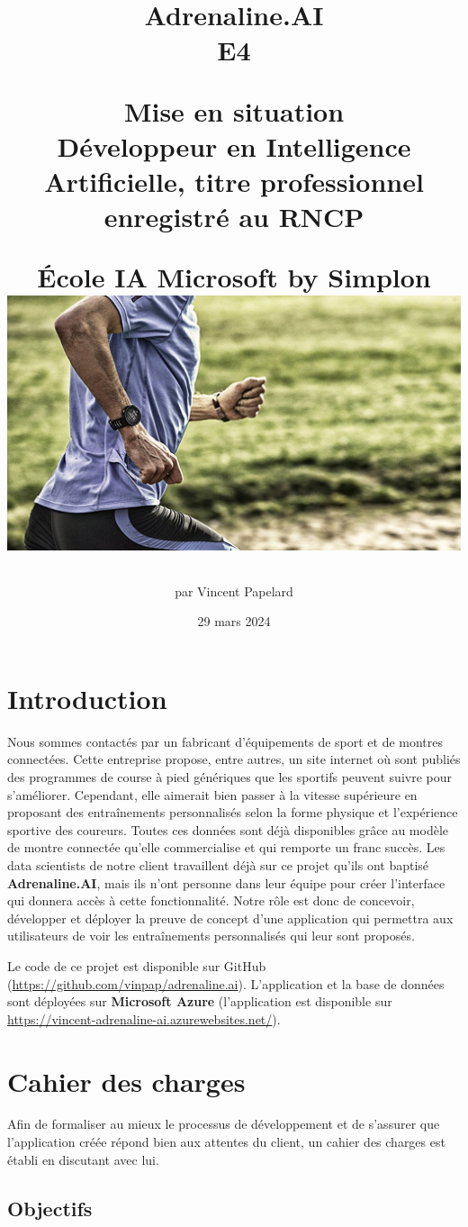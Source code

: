 \documentclass[french]{article}
\title{%
    \huge Adrenaline.AI  \\
    \bigskip
    \large E4 \item Mise en situation \\ 
    Développeur en Intelligence Artificielle,
    titre professionnel enregistré au RNCP \item École IA Microsoft by Simplon
    \vfill
    \includegraphics[width=14cm]{running.jpeg}
    \vfill}
\date{29 mars 2024}
\author{par Vincent Papelard}
\begin{document}
    \renewcommand{\contentsname}{Table des Matières}
    \renewcommand{\refname}{Références}
    \maketitle
    \newpage
    \tableofcontents
    \newpage

    \section*{Introduction}

    Nous sommes contactés par un fabricant d'équipements de sport et de montres connectées. Cette entreprise propose, entre autres, un site internet où sont publiés des programmes de course à pied génériques que les sportifs peuvent suivre pour s'améliorer. Cependant, elle aimerait bien passer à la vitesse supérieure en proposant des entraînements personnalisés selon la forme physique et l'expérience sportive des coureurs. Toutes ces données sont déjà disponibles grâce au modèle de montre connectée qu'elle commercialise et qui remporte un franc succès. Les data scientists de notre client travaillent déjà sur ce projet qu'ils ont baptisé \textbf{Adrenaline.AI}, mais ils n'ont personne dans leur équipe pour créer l'interface qui donnera accès à cette fonctionnalité. Notre rôle est donc de concevoir, développer et déployer la preuve de concept d'une application qui permettra aux utilisateurs de voir les entraînements personnalisés qui leur sont proposés.
    
    Le code de ce projet est disponible sur GitHub (\href{https://github.com/vinpap/adrenaline.ai}{https://github.com/vinpap/adrenaline.ai}). L'application et la base de données sont déployées sur \textbf{Microsoft Azure} (l'application est disponible sur \href{https://vincent-adrenaline-ai.azurewebsites.net/}{https://vincent-adrenaline-ai.azurewebsites.net/}).
    \section{Cahier des charges}

    Afin de formaliser au mieux le processus de développement et de s'assurer que l'application créée répond bien aux attentes du client, un cahier des charges est établi en discutant avec lui.

    \subsection{Objectifs}
\end{document}
